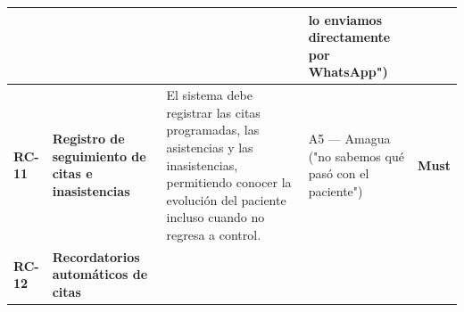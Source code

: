 \documentclass[
]{article}
\newcounter{none} %
\begin{document}
{\def\LTcaptype{none} %
\begin{longtable}[]{@{}
  >{\raggedright\arraybackslash}p{}
  >{\raggedright\arraybackslash}p{}
  >{\raggedright\arraybackslash}p{}
  >{\raggedright\arraybackslash}p{}
  >{\centering\arraybackslash}p{}@{}}
\toprule\noalign{}
\begin{minipage}[b]{\linewidth}\raggedright
\end{minipage} & \begin{minipage}[b]{\linewidth}\raggedright
\end{minipage} & \begin{minipage}[b]{\linewidth}\raggedright
\end{minipage} & \begin{minipage}[b]{\linewidth}\raggedright
lo enviamos directamente por WhatsApp")
\end{minipage} & \begin{minipage}[b]{\linewidth}\centering
\end{minipage} \\
\midrule\noalign{}
\endhead
\bottomrule\noalign{}
\endlastfoot
\begin{minipage}[t]{\linewidth}\raggedright
\textbf{RC-11}
\end{minipage} & \begin{minipage}[t]{\linewidth}\raggedright
\textbf{Registro de seguimiento de citas e inasistencias}
\end{minipage} & \begin{minipage}[t]{\linewidth}\raggedright
El sistema debe registrar las citas programadas, las asistencias y las
inasistencias, permitiendo conocer la evolución del paciente incluso
cuando no regresa a control.
\end{minipage} & \begin{minipage}[t]{\linewidth}\raggedright
A5 --- Amagua ("no sabemos qué pasó con el paciente")
\end{minipage} & \textbf{Must} \\
\begin{minipage}[t]{\linewidth}\raggedright
\textbf{RC-12}
\end{minipage} & \begin{minipage}[t]{\linewidth}\raggedright
\textbf{Recordatorios automáticos de citas}
\end{minipage} & \begin{minipage}[t]{\linewidth}\raggedright

\end{minipage}
\end{longtable}}
\end{document}
